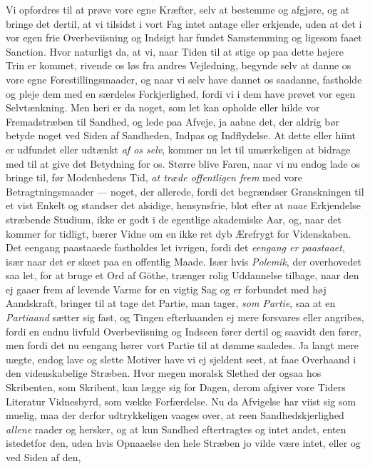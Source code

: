 \documentclass[12pt,a4paper]{book}
\newcommand{\apage}[1]{\marginnote{\footnotesize\textit{[#1]}}}
\begin{document}
Vi opfordres til at prøve vore egne Kræfter, selv at bestemme og afgjøre, og at
bringe det dertil, at vi tilsidst i vort Fag intet antage eller erkjende, uden at
det i vor egen frie Overbeviisning og Indsigt har fundet Samstemming og ligesom
faaet Sanction. Hvor naturligt da, at vi, naar Tiden til at stige op paa dette
højere Trin er kommet, rivende os løs fra andres Vejledning, begynde selv at danne
os vore egne Forestillingsmaader, og naar vi selv have dannet os saadanne,
fastholde og pleje dem med en særdeles Forkjerlighed, fordi vi i dem have prøvet
vor egen Selvtænkning. Men heri er da noget, som let kan opholde eller hilde vor
Fremadstræben til Sandhed, og lede paa Afveje, ja aabne det, der aldrig bør betyde
noget ved Siden af Sandheden, Indpas og Indflydelse. At dette eller hiint er
udfundet eller udtænkt \emph{af os selv}, \apage{176}  kommer nu let til umærkeligen at bidrage med
til at give det Betydning for os. Større blive Faren, naar vi nu endog lade os
bringe til, før Modenhedens Tid, \emph{at træde offentligen frem} med vore
Betragtningsmaader --- noget, der allerede, fordi det begrændser Granskningen til et
vist Enkelt og standser det alsidige, hensynsfrie, blot efter at \emph{naae} Erkjendelse
stræbende Studium, ikke er godt i de egentlige akademiske Aar, og, naar det kommer
for tidligt, bærer Vidne om en ikke ret dyb Ærefrygt for Videnskaben. Det eengang
paastaaede fastholdes let ivrigen, fordi det \emph{eengang er paastaaet}, især naar det
er skeet paa en offentlig Maade. Især hvis \emph{Polemik}, der overhovedet saa let, for
at bruge et Ord af Göthe, trænger rolig Uddannelse tilbage, naar den ej gaaer frem
af levende Varme for en vigtig Sag og er forbundet med høj Aandskraft, bringer til
at tage det Partie, man tager, \emph{som Partie}, saa at en \emph{Partiaand}
sætter sig fast, og Tingen efterhaanden ej mere forsvares eller angribes, fordi en
endnu livfuld Overbeviisning og Indseen fører dertil og saavidt den fører, men
fordi det nu eengang hører vort Partie til at dømme saaledes. Ja langt mere
uægte, endog lave og slette Motiver have vi ej sjeldent seet, at faae Overhaand
i den videnskabelige Stræben. Hvor megen moralsk Slethed der ogsaa hos Skribenten,
som \apage{177} Skribent, kan lægge sig for Dagen, derom afgiver vore Tiders Literatur
Vidnesbyrd, som vække Forfærdelse. Nu da Afvigelse har viist sig som muelig, maa der
derfor udtrykkeligen vaages over, at reen Sandhedskjerlighed \emph{allene} raader og
hersker, og at kun Sandhed eftertragtes og intet andet, enten istedetfor den, uden
hvis Opnaaelse den hele Stræben jo vilde være intet, eller og ved Siden af den,
\end{document}
